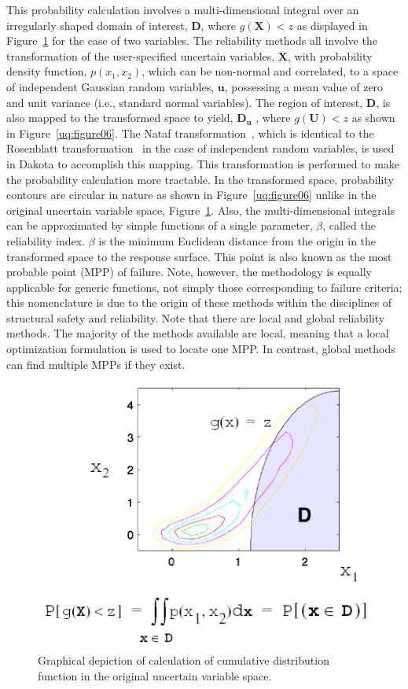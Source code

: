 This probability calculation involves a multi-dimensional integral
over an irregularly shaped domain of interest, $\mathbf{D}$, where
$g(\mathbf{X}) < z$ as displayed in Figure~\ref{uq:figure05} for the
case of two variables. The reliability methods all involve the
transformation of the user-specified uncertain variables,
$\mathbf{X}$, with probability density function, $p(x_1,x_2)$, which
can be non-normal and correlated, to a space of independent Gaussian
random variables, $\mathbf{u}$, possessing a mean value of zero and
unit variance (i.e., standard normal variables). The region of
interest, $\mathbf{D}$, is also mapped to the transformed space to
yield, $\mathbf{D_{u}}$ , where $g(\mathbf{U}) < z$ as shown in
Figure~\ref{uq:figure06}. The Nataf transformation~\cite{Der86},
which is identical to the Rosenblatt transformation~\cite{Ros52} in
the case of independent random variables, is used in Dakota to
accomplish this mapping. This transformation is performed to make the
probability calculation more tractable. In the transformed space,
probability contours are circular in nature as shown in
Figure~\ref{uq:figure06} unlike in the original uncertain variable
space, Figure~\ref{uq:figure05}. Also, the multi-dimensional integrals
can be approximated by simple functions of a single parameter,
$\beta$, called the reliability index. $\beta$ is the minimum
Euclidean distance from the origin in the transformed space to the
response surface. This point is also known as the most probable point
(MPP) of failure. Note, however, the methodology is equally applicable
for generic functions, not simply those corresponding to failure
criteria; this nomenclature is due to the origin of these methods
within the disciplines of structural safety and reliability.
Note that there are local and global reliability methods. The majority 
of the methods available are local, meaning that a local optimization 
formulation is used to locate one MPP. In contrast, global methods
can find multiple MPPs if they exist.
\begin{figure}[htbp!]
  \centering
  \includegraphics[scale=0.75]{images/cdf_orig_graphic}
  \caption{Graphical depiction of calculation of cumulative
    distribution function in the original uncertain variable space.}
  \label{uq:figure05}
\end{figure}

